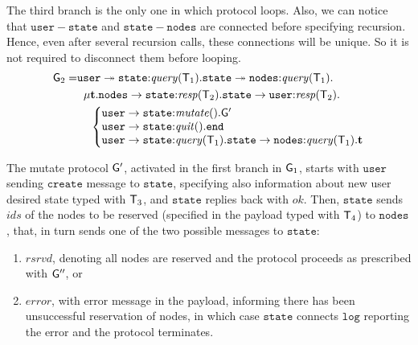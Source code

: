 \noindent
The third branch is the only one in which protocol loops. Also, we can notice that $\mathtt{user}-\mathtt{state}$ and $\mathtt{state}-\mathtt{nodes}$ are connected before specifying recursion. Hence, even after several recursion calls, these connections will be unique. So it is not required to disconnect them before looping.   
\begin{align*}
\G_2 = & 
\mathtt{user} \twoheadrightarrow \mathtt{state}{:}\mathit{query}(\T_1).
\mathtt{state}\twoheadrightarrow \mathtt{nodes}{:}\mathit{query}(\T_1). \\
& \hspace{2mm}
\mu \ty.
\mathtt{nodes}\to \mathtt{state}{:}\mathit{resp}(\T_2).
\mathtt{state}\to\mathtt{user}{:}\mathit{resp}(\T_2). \\
& \hspace{4mm}
\left\{
\begin{array}{@{}l@{}}
\mathtt{user}\to\mathtt{state}{:} \mathit{mutate}().\G'\\
\mathtt{user}\to\mathtt{state}{:} \mathit{quit}().\tend\\
\mathtt{user}\to\mathtt{state}{:} \mathit{query}(\T_1).\mathtt{state}\to\mathtt{nodes}{:}\mathit{query}(\T_1).\ty
\end{array} \right.
\end{align*}

\noindent
The mutate protocol ${\sf G}'$, activated in the first branch in ${\sf G}_1$, starts with $\mathtt{user}$ sending 
$\mathtt{create}$ message to $\mathtt{state}$, specifying also information about new user desired state typed with ${\mathsf T}_3$, 
and $\mathtt{state}$ replies back with $\mathit{ok}$. 
Then, $\mathtt{state}$ sends $\mathit{ids}$ of the nodes to be reserved (specified in the payload typed with ${\mathsf T}_4$) to $\mathtt{nodes}$, that, in turn sends one of the two possible messages to $\mathtt{state}$: 

\begin{enumerate}[start=1,label={(\bfseries \roman*)}]
	\item $\mathit{rsrvd}$, denoting all nodes are reserved and the protocol proceeds as prescribed with ${\sf G}''$, or
	\item $\mathit{error}$, with error message in the payload, informing there has been unsuccessful reservation of nodes, in which case $\mathtt{state}$ connects $\mathtt{log}$ reporting the error and the protocol terminates.
\end{enumerate}

